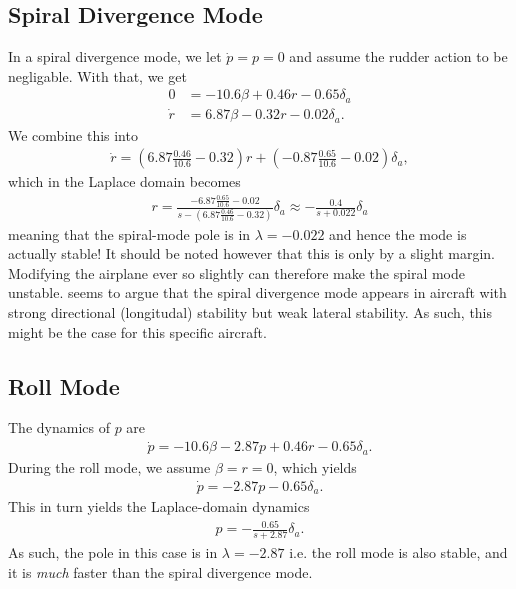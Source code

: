 \subsection{Spiral Divergence Mode}
In a spiral divergence mode, we let $\dot p = p = 0$ and assume the rudder action to be negligable. With that, we get
\begin{align}
0 &= -10.6 \beta + 0.46 r - 0.65 \delta_a \\
\dot r &= 6.87 \beta - 0.32 r - 0.02 \delta_a.
\end{align}
We combine this into
\begin{equation}\begin{aligned}
\dot r = \left(6.87 \frac{0.46}{10.6} - 0.32 \right) r
+ \left( -0.87 \frac{0.65}{10.6} - 0.02 \right) \delta_a,
\end{aligned}\end{equation}
which in the Laplace domain becomes
\begin{equation}\begin{aligned}
r = \frac{-6.87 \frac{0.65}{10.6} - 0.02}{s - (6.87 \frac{0.46}{10.6} -0.32)} \delta_a
\approx -\frac{0.4}{s + 0.022} \delta_a
\end{aligned}\end{equation}
meaning that the spiral-mode pole is in $\lambda = -0.022$ and hence the mode is actually stable! It should be noted however that this is only by a slight margin. Modifying the airplane ever so slightly can therefore make the spiral mode unstable. \cite{nasa} seems to argue that the spiral divergence mode appears in aircraft with strong directional (longitudal) stability but weak lateral stability. As such, this might be the case for this specific aircraft.

\subsection{Roll Mode}
The dynamics of $p$ are
\begin{equation}\begin{aligned}
\dot p = -10.6 \beta - 2.87 p + 0.46 r - 0.65 \delta_a.
\end{aligned}\end{equation}
During the roll mode, we assume $\beta = r = 0$, which yields
\begin{equation}\begin{aligned}
\dot p = -2.87 p - 0.65 \delta_a.
\end{aligned}\end{equation}
This in turn yields the Laplace-domain dynamics
\begin{equation}\begin{aligned}
p = - \frac{0.65}{s + 2.87} \delta_a.
\end{aligned}\end{equation}
As such, the pole in this case is in $\lambda = -2.87$ i.e. the roll mode is also stable, and it is \textit{much} faster than the spiral divergence mode.

